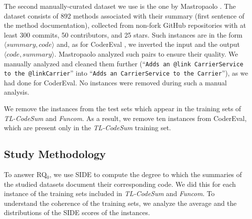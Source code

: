 The second manually-curated dataset we use is the one by Mastropaolo \etal \cite{mastropaolo2023robustness}. The dataset consists of 892 methods associated with their summary (\ie first sentence of the method documentation), collected from non-fork GitHub \java repositories with at least 300 commits, 50 contributors, and 25 stars. 
Such instances are in the form $\langle summary, code\rangle$ and, as for CoderEval \cite{yu2024codereval}, we inverted the input and the output \ie $\langle code, summary\rangle$. Mastropaolo \etal  analyzed such pairs to ensure their quality. We manually analyzed and cleaned them further (\eg ``\texttt{Adds an {@link CarrierService} to the {@linkCarrier}}'' into ``\texttt{Adds an CarrierService to the Carrier}''), as we had done for CoderEval. No instances were removed during such a manual analysis.

We remove the instances from the test sets which appear in the training sets of \textit{TL-CodeSum} and \textit{Funcom}. As a result, we remove ten instances from CoderEval, which are present only in the \textit{TL-CodeSum} training set.

\subsection{Study Methodology}
\label{subsec:exp_proc}
To answer RQ$_{0}$, we use SIDE to compute the degree to which the summaries of the studied datasets document their corresponding code. We did this for each instance of the training sets included in \textit{TL-CodeSum} and \textit{Funcom}. To understand the coherence of the training sets, we analyze the average and the distributions of the SIDE scores of the instances.\\

\addtolength{\extrarowheight}{\belowrulesep}
\aboverulesep=0pt
\belowrulesep=0pt
\begin{table}[t]
	\centering
	\caption{Different selections for \textit{TL-CodeSum} and \textit{Funcom} training sets.}
	\label{tab:dataset_w_strategies}
\end{table}

